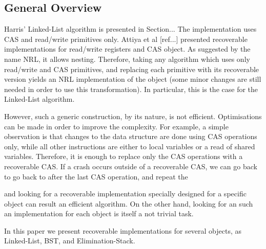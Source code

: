 \subsection{General Overview}
Harris' Linked-List algorithm is presented in Section... The implementation uses CAS and read/write primitives only.
Attiya et al [ref...] presented recoverable implementations for read/write registers and CAS object. As suggested by the name NRL, it allows nesting. Therefore, taking any algorithm which uses only read/write and CAS primitives, and replacing each primitive with its recoverable version yields an NRL implementation of the object (some minor changes are still needed in order to use this transformation). In particular, this is the case for the Linked-List algorithm.

However, such a generic construction, by its nature, is not efficient. Optimisations can be made in order to improve the complexity. For example, a simple observation is that changes to the data structure are done using CAS operations only, while all other instructions are either to local variables or a read of shared variables. Therefore, it is enough to replace only the CAS operations with a recoverable CAS. If a crash occurs outside of a recoverable CAS, we can go back to go back to after the last CAS operation, and repeat the 


and looking for a recoverable implementation specially designed for a specific object can result an efficient algorithm. On the other hand, looking for an such an implementation for each object is itself a not trivial task.





In this paper we present recoverable implementations for several objects, as Linked-List, BST, and Elimination-Stack. 
